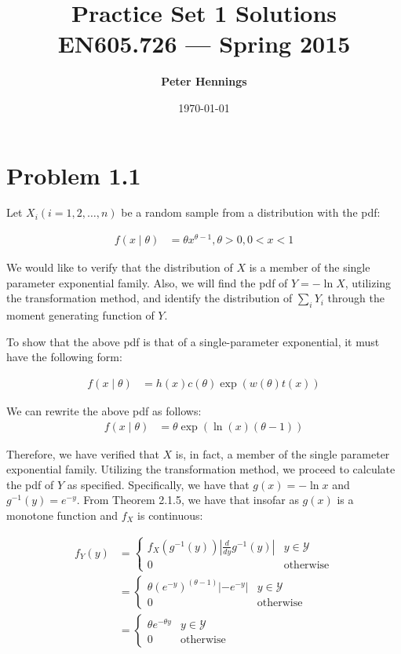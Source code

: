 \documentclass[11pt]{article}
\title{\bf Practice Set 1 Solutions\\[2ex] 
       \rm\normalsize EN605.726 --- Spring 2015}
\date{\today}
\author{\bf Peter Hennings}
\begin{document}
\maketitle

\section*{Problem 1.1} 

Let $X_i (i = 1,2,\dots,n)$ be a random sample from a distribution with the pdf:

\begin{align*}
  f(x \mid \theta) &= \theta x^{\theta-1}, \theta > 0, 0 < x < 1
\end{align*}

We would like to verify that the distribution of $X$ is a member of the single parameter exponential family.  Also, we will find the pdf of $Y = -\ln{X}$, utilizing the transformation method, and identify the distribution of $\sum_i Y_i$ through the moment generating function of $Y$.

To show that the above pdf is that of a single-parameter exponential, it must have the following form:

\begin{align*}
  f(x \mid \theta) &= h(x)c(\theta) \exp{\left(  w(\theta) t(x) \right)}
\end{align*}

We can rewrite the above pdf as follows:
\begin{align*}
  f(x \mid \theta) &= \theta \exp{(\ln{(x)}(\theta-1))}
\end{align*}

Therefore, we have verified that $X$ is, in fact, a member of the single parameter exponential family.  Utilizing the transformation method, we proceed to calculate the pdf of $Y$ as specified.  Specifically, we have that $g(x) = -\ln{x}$ and $g^{-1}(y) = e^{-y}$.  From Theorem 2.1.5, we have that insofar as $g(x)$ is a monotone function and $f_X$ is continuous:

\begin{align*}
  f_Y(y) &= 
           \begin{cases}
             f_X(g^{-1}(y)) \left| \frac{d}{dy} g^{-1}(y) \right| & y \in \mathcal{Y} \\
             0 & \text{otherwise}
           \end{cases} \\
  &= 
    \begin{cases}
      \theta (e^{-y})^{(\theta-1)} \left| -e^{-y} \right| & y \in \mathcal{Y} \\
      0 & \text{otherwise}
    \end{cases} \\
  &= 
    \begin{cases}
      \theta e^{-\theta y} & y \in \mathcal{Y} \\
      0 & \text{otherwise}
    \end{cases}
\end{align*}
\end{document}
